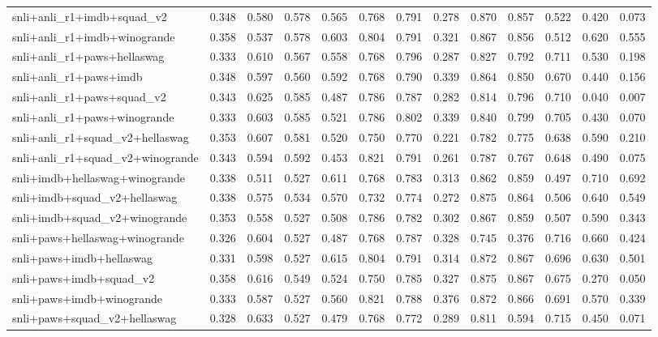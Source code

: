 \begin{table}[t]
\begin{tabular}{lrrrrrrrrrrrr}
    snli+anli\_r1+imdb+squad\_v2 & 0.348 & 0.580 & 0.578 & 0.565 & 0.768 & 0.791 & 0.278 & 0.870 & 0.857 & 0.522 & 0.420 & 0.073 \\
    snli+anli\_r1+imdb+winogrande & 0.358 & 0.537 & 0.578 & 0.603 & 0.804 & 0.791 & 0.321 & 0.867 & 0.856 & 0.512 & 0.620 & 0.555 \\
    snli+anli\_r1+paws+hellaswag & 0.333 & 0.610 & 0.567 & 0.558 & 0.768 & 0.796 & 0.287 & 0.827 & 0.792 & 0.711 & 0.530 & 0.198 \\
    snli+anli\_r1+paws+imdb & 0.348 & 0.597 & 0.560 & 0.592 & 0.768 & 0.790 & 0.339 & 0.864 & 0.850 & 0.670 & 0.440 & 0.156 \\
    snli+anli\_r1+paws+squad\_v2 & 0.343 & 0.625 & 0.585 & 0.487 & 0.786 & 0.787 & 0.282 & 0.814 & 0.796 & 0.710 & 0.040 & 0.007 \\
    snli+anli\_r1+paws+winogrande & 0.333 & 0.603 & 0.585 & 0.521 & 0.786 & 0.802 & 0.339 & 0.840 & 0.799 & 0.705 & 0.430 & 0.070 \\
    snli+anli\_r1+squad\_v2+hellaswag & 0.353 & 0.607 & 0.581 & 0.520 & 0.750 & 0.770 & 0.221 & 0.782 & 0.775 & 0.638 & 0.590 & 0.210 \\
    snli+anli\_r1+squad\_v2+winogrande & 0.343 & 0.594 & 0.592 & 0.453 & 0.821 & 0.791 & 0.261 & 0.787 & 0.767 & 0.648 & 0.490 & 0.075 \\
    snli+imdb+hellaswag+winogrande & 0.338 & 0.511 & 0.527 & 0.611 & 0.768 & 0.783 & 0.313 & 0.862 & 0.859 & 0.497 & 0.710 & 0.692 \\
    snli+imdb+squad\_v2+hellaswag & 0.338 & 0.575 & 0.534 & 0.570 & 0.732 & 0.774 & 0.272 & 0.875 & 0.864 & 0.506 & 0.640 & 0.549 \\
    snli+imdb+squad\_v2+winogrande & 0.353 & 0.558 & 0.527 & 0.508 & 0.786 & 0.782 & 0.302 & 0.867 & 0.859 & 0.507 & 0.590 & 0.343 \\
    snli+paws+hellaswag+winogrande & 0.326 & 0.604 & 0.527 & 0.487 & 0.768 & 0.787 & 0.328 & 0.745 & 0.376 & 0.716 & 0.660 & 0.424 \\
    snli+paws+imdb+hellaswag & 0.331 & 0.598 & 0.527 & 0.615 & 0.804 & 0.791 & 0.314 & 0.872 & 0.867 & 0.696 & 0.630 & 0.501 \\
    snli+paws+imdb+squad\_v2 & 0.358 & 0.616 & 0.549 & 0.524 & 0.750 & 0.785 & 0.327 & 0.875 & 0.867 & 0.675 & 0.270 & 0.050 \\
    snli+paws+imdb+winogrande & 0.333 & 0.587 & 0.527 & 0.560 & 0.821 & 0.788 & 0.376 & 0.872 & 0.866 & 0.691 & 0.570 & 0.339 \\
    snli+paws+squad\_v2+hellaswag & 0.328 & 0.633 & 0.527 & 0.479 & 0.768 & 0.772 & 0.289 & 0.811 & 0.594 & 0.715 & 0.450 & 0.071 \\

\end{tabular}
\end{table}
